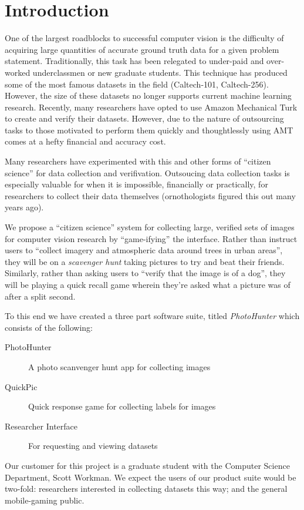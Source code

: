 \documentclass{article}
\begin{document}
\section{Introduction}

One of the largest roadblocks to successful computer vision is the difficulty of
acquiring large quantities of accurate ground truth data for a given problem
statement. Traditionally, this task has been relegated to under-paid and over-worked
underclassmen or new graduate students. This technique has produced some of the
most famous datasets in the field (Caltech-101, Caltech-256). However, the size of
these datasets no longer supports current machine learning research. Recently,
many researchers have opted to use Amazon Mechanical Turk to create and verify their
datasets. However, due to the nature of outsourcing tasks to those motivated to
perform them quickly and thoughtlessly using AMT comes at a hefty financial and
accuracy cost.

Many researchers have experimented with this and other forms of ``citizen science''
for data collection and verifivation. Outsoucing data collection tasks is especially
valuable for when it is impossible, financially or practically, for researchers to
collect their data themselves (ornothologists figured this out many years ago).

We propose a ``citizen science'' system for collecting large, verified sets of images
for computer vision research by ``game-ifying'' the interface. Rather than instruct
users to ``collect imagery and atmospheric data around trees in urban areas'', they
will be on a {\em scavenger hunt} taking pictures to try and beat their friends.
Similarly, rather than asking users to ``verify that the image is of a dog'', they
will be playing a quick recall game wherein they're asked what a picture was of after
a split second.

To this end we have created a three part software suite, titled {\em PhotoHunter}
which consists of the following:
\begin{description}
	\item[PhotoHunter] A photo scanvenger hunt app for collecting images
	\item[QuickPic] Quick response game for collecting labels for images
	\item[Researcher Interface] For requesting and viewing datasets
\end{description}

Our customer for this project is a graduate student with the Computer Science
Department, Scott Workman. We expect the users of our product suite would be
two-fold: researchers interested in collecting datasets this way; and the general
mobile-gaming public.
\end{document}
